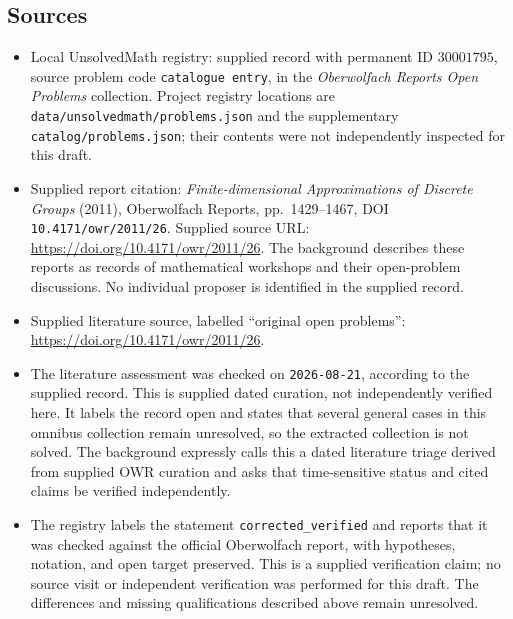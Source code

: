 \documentclass[11pt]{article}
\begin{document}
\subsection{Sources}
\begin{itemize}
\item Local UnsolvedMath registry: supplied record with permanent ID \(30001795\), source problem code \texttt{catalogue entry}, in the \emph{Oberwolfach Reports Open Problems} collection. Project registry locations are \texttt{data/unsolvedmath/problems.json} and the supplementary \texttt{catalog/problems.json}; their contents were not independently inspected for this draft.
\item Supplied report citation: \emph{Finite-dimensional Approximations of Discrete Groups} (2011), Oberwolfach Reports, pp.~1429--1467, DOI \texttt{10.4171/owr/2011/26}. Supplied source URL: \url{https://doi.org/10.4171/owr/2011/26}. The background describes these reports as records of mathematical workshops and their open-problem discussions. No individual proposer is identified in the supplied record.
\item Supplied literature source, labelled ``original open problems'': \url{https://doi.org/10.4171/owr/2011/26}.
\item The literature assessment was checked on \texttt{2026-08-21}, according to the supplied record. This is supplied dated curation, not independently verified here. It labels the record open and states that several general cases in this omnibus collection remain unresolved, so the extracted collection is not solved. The background expressly calls this a dated literature triage derived from supplied OWR curation and asks that time-sensitive status and cited claims be verified independently.
\item The registry labels the statement \texttt{corrected\_verified} and reports that it was checked against the official Oberwolfach report, with hypotheses, notation, and open target preserved. This is a supplied verification claim; no source visit or independent verification was performed for this draft. The differences and missing qualifications described above remain unresolved.
\end{itemize}
\end{document}
